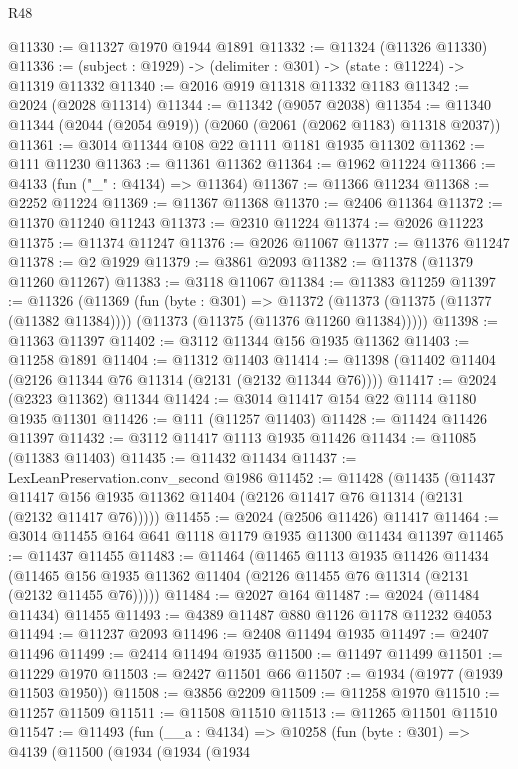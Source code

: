 \begin{lexlean}{R48}
\begin{coremodule}
@11330 := @11327 @1970 @1944 @1891
@11332 := @11324 (@11326 @11330)
@11336 := (subject : @1929) -> (delimiter : @301) -> (state : @11224) -> @11319 @11332
@11340 := @2016 @919 @11318 @11332 @1183
@11342 := @2024 (@2028 @11314)
@11344 := @11342 (@9057 @2038)
@11354 := @11340 @11344 (@2044 (@2054 @919)) (@2060 (@2061 (@2062 @1183) @11318 @2037))
@11361 := @3014 @11344 @108 @22 @1111 @1181 @1935 @11302
@11362 := @111 @11230
@11363 := @11361 @11362
@11364 := @1962 @11224
@11366 := @4133 (fun ("_" : @4134) => @11364)
@11367 := @11366 @11234
@11368 := @2252 @11224
@11369 := @11367 @11368
@11370 := @2406 @11364
@11372 := @11370 @11240 @11243
@11373 := @2310 @11224
@11374 := @2026 @11223
@11375 := @11374 @11247
@11376 := @2026 @11067
@11377 := @11376 @11247
@11378 := @2 @1929
@11379 := @3861 @2093
@11382 := @11378 (@11379 @11260 @11267)
@11383 := @3118 @11067
@11384 := @11383 @11259
@11397 := @11326
    (@11369
      (fun (byte : @301) =>
      @11372 (@11373 (@11375 (@11377 (@11382 @11384)))) (@11373 (@11375 (@11376 @11260 @11384)))))
@11398 := @11363 @11397
@11402 := @3112 @11344 @156 @1935 @11362
@11403 := @11258 @1891
@11404 := @11312 @11403
@11414 := @11398 (@11402 @11404 (@2126 @11344 @76 @11314 (@2131 (@2132 @11344 @76))))
@11417 := @2024 (@2323 @11362) @11344
@11424 := @3014 @11417 @154 @22 @1114 @1180 @1935 @11301
@11426 := @111 (@11257 @11403)
@11428 := @11424 @11426 @11397
@11432 := @3112 @11417 @1113 @1935 @11426
@11434 := @11085 (@11383 @11403)
@11435 := @11432 @11434
@11437 := LexLeanPreservation.conv_second @1986
@11452 := @11428
    (@11435
      (@11437 @11417 @156 @1935 @11362 @11404 (@2126 @11417 @76 @11314 (@2131 (@2132 @11417 @76)))))
@11455 := @2024 (@2506 @11426) @11417
@11464 := @3014 @11455 @164 @641 @1118 @1179 @1935 @11300 @11434 @11397
@11465 := @11437 @11455
@11483 := @11464
    (@11465
      @1113
      @1935
      @11426
      @11434
      (@11465 @156 @1935 @11362 @11404 (@2126 @11455 @76 @11314 (@2131 (@2132 @11455 @76)))))
@11484 := @2027 @164
@11487 := @2024 (@11484 @11434) @11455
@11493 := @4389 @11487 @880 @1126 @1178 @11232 @4053
@11494 := @11237 @2093
@11496 := @2408 @11494 @1935
@11497 := @2407 @11496
@11499 := @2414 @11494 @1935
@11500 := @11497 @11499
@11501 := @11229 @1970
@11503 := @2427 @11501 @66
@11507 := @1934 (@1977 (@1939 @11503 @1950))
@11508 := @3856 @2209
@11509 := @11258 @1970
@11510 := @11257 @11509
@11511 := @11508 @11510
@11513 := @11265 @11501 @11510
@11547 := @11493
    (fun (__a : @4134) =>
    @10258
      (fun (byte : @301) =>
      @4139
        (@11500
          (@1934
            (@1934
              (@1934

\end{coremodule}
\end{lexlean}
